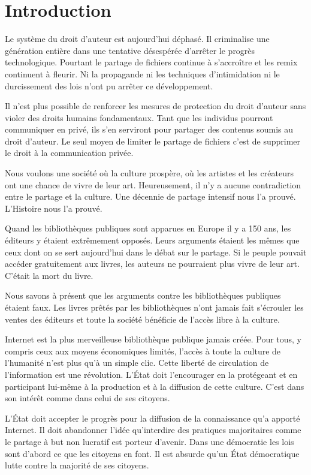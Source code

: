 \chapter*{Introduction}\label{premintro}

Le système du droit d’auteur est aujourd’hui déphasé. Il criminalise une génération entière dans une tentative désespérée d’arrêter le progrès technologique. Pourtant le partage de fichiers continue à s’accroître et les remix continuent à fleurir. Ni la propagande ni les techniques d’intimidation ni le durcissement des lois n’ont pu arrêter ce développement.

Il n’est plus possible de renforcer les mesures de protection du droit d'auteur sans violer des droits humains fondamentaux. Tant que les individus pourront communiquer en privé, ils s’en serviront pour partager des contenus soumis au droit d’auteur. Le seul moyen de limiter le partage de fichiers c’est de supprimer le droit à la communication privée.

Nous voulons une société où la culture prospère, où les artistes et les créateurs ont une chance de vivre de leur art. Heureusement, il n’y a aucune contradiction entre le partage et la culture. Une décennie de partage intensif nous l’a prouvé. L'Histoire nous l'a prouvé.

Quand les bibliothèques publiques sont apparues en Europe il y a 150 ans, les éditeurs y étaient extrêmement opposés. Leurs arguments étaient les mêmes que ceux dont on se sert aujourd’hui dans le débat sur le partage. Si le peuple pouvait accéder gratuitement aux livres, les auteurs ne pourraient plus vivre de leur art. C'était la mort du livre.

Nous savons à présent que les arguments contre les bibliothèques publiques étaient faux. Les livres prêtés par les bibliothèques n'ont jamais fait s'écrouler les ventes des éditeurs et toute la société bénéficie de l'accès libre à la culture. 

Internet est la plus merveilleuse bibliothèque publique jamais créée. Pour tous, y compris ceux aux moyens économiques limités, l’accès à toute la culture de l’humanité n’est plus qu’à un simple clic. Cette liberté de circulation de l'information est une révolution. L'État doit l'encourager en la protégeant et en participant lui-même à la production et à la diffusion de cette culture. C'est dans son intérêt comme dans celui de ses citoyens. 

L'État doit accepter le progrès pour la diffusion de la connaissance qu'a apporté Internet. Il doit abandonner l'idée qu'interdire des pratiques majoritaires comme le partage à but non lucratif est porteur d'avenir. Dans une démocratie les lois sont d'abord ce que les citoyens en font. Il est absurde qu'un État démocratique lutte contre la majorité de ses citoyens.

